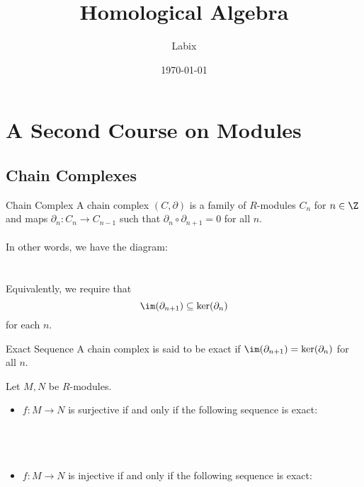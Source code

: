 \documentclass[a4paper]{article}
\title{Homological Algebra}
\author{Labix}
\date{\today}
\begin{document}
\maketitle
\begin{abstract}
\end{abstract}
\pagebreak
\tableofcontents
\pagebreak

\section{A Second Course on Modules}
\subsection{Chain Complexes}
\begin{defn}{Chain Complex}{} A chain complex $(C,\partial)$ is a family of $R$-modules $C_n$ for $n\in\Z$ and maps $\partial_n:C_n\to C_{n-1}$ such that $\partial_n\circ\partial_{n+1}=0$ for all $n$. \\~\\
In other words, we have the diagram: \\
\\~\\
Equivalently, we require that $$\im(\partial_{n+1})\subseteq\ker(\partial_n)$$ for each $n$. 
\end{defn}

\begin{defn}{Exact Sequence}{} A chain complex is said to be exact if $\im(\partial_{n+1})=\ker(\partial_n)$ for all $n$. 
\end{defn}

\begin{prp}{}{} Let $M,N$ be $R$-modules. 
\begin{itemize}
\item $f:M\to N$ is surjective if and only if the following sequence is exact: \\~\\
\\~\\
\item $f:M\to N$ is injective if and only if the following sequence is exact: \\~\\
\\~\\
\end{itemize}
\end{prp}
\end{document}
